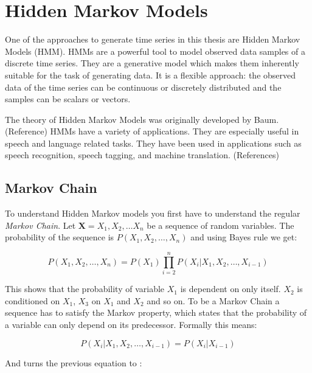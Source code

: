 
\chapter{Hidden Markov Models}\label{chapter:hmm}

One of the approaches to generate time series in this thesis are Hidden Markov Models (HMM). HMMs are a powerful tool to model observed data samples of a discrete time series. They are a generative model which makes them inherently suitable for the task of generating data. It is a flexible approach: the observed data of the time series can be continuous or discretely distributed and the samples can be scalars or vectors. 

The theory of Hidden Markov Models was originally developed by Baum. (Reference) HMMs have a variety of applications. They are especially useful in speech and language related tasks. They have been used in applications such as speech recognition, speech tagging, and machine translation. (References)

\section{Markov Chain}
To understand Hidden Markov models you first have to understand the regular \emph{Markov Chain}. Let $\mathbf{X}=X_{1}, X_{2}, \ldots X_{n}$ be a sequence of random variables. The probability of the sequence is $P\left(X_{1}, X_{2}, \ldots, X_{n}\right)$ and using Bayes rule we get: 

\begin{equation}
P\left(X_{1}, X_{2}, \ldots, X_{n}\right)=P\left(X_{1}\right) \prod_{i=2}^{n} P\left(X_{i} |X_{1}, X_{2}, \ldots, X_{i-1}\right)
\end{equation}

This shows that the probability of variable $X_1$ is dependent on only itself. $X_2$ is conditioned on $X_1$, $X_3$ on $X_1$ and $X_2$ and so on. To be a Markov Chain a sequence has to satisfy the Markov property, which states that the probability of a variable can only depend on its predecessor. Formally this means: 

\begin{equation}
P\left(X_{i} | X_{1}, X_{2}, \ldots, X_{i-1}\right)=P\left(X_{i} | X_{i-1}\right)
\end{equation}

And turns the previous equation to :

